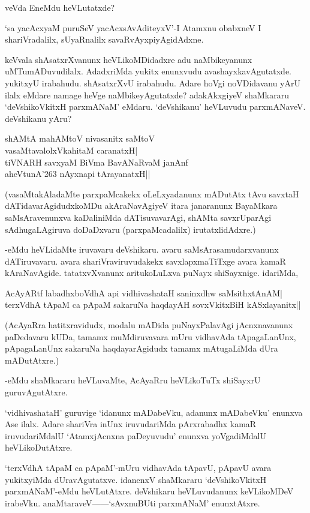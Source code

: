 veVda EneMdu heVLutatxde?

`sa yacAcxyaM puruSeV yacAcxsAvAditeyxV'-I Atamxnu obabxneV I shariVradalilx, sUyaRnalilx savaRvAyxpiyAgidAdxne.

keVvala shAsatxrXvanunx heVLikoMDidadxre adu naMbikeyanunx uMTumADuvudilalx. AdadxriMda yukitx enunxvudu avashayxkavAgutatxde. yukitxyU irabahudu. shAsatxrXvU irabahudu. Adare hoVgi noVDidavanu yArU ilalx eMdare namage heVge naMbikeyAgutatxde? adakAkxgiyeV shaMkararu `deVshikoVkitxH parxmANaM' eMdaru. `deVshikanu' heVLuvudu parxmANaveV. deVshikanu yAru?

\begin{shloka}
shAMtA mahAMtoV nivasanitx saMtoV\\
vasaMtavalolxVkahitaM caranatxH|\\
tiVNARH savxyaM BiVma BavANaRvaM janAnf\\
aheVtunA\char'263 nAyxnapi tArayanatxH||
\end{shloka}

(vasaMtakAladaMte parxpaMcakekx oLeLxyadanunx mADutAtx tAvu savxtaH dATidavarAgidudxkoMDu akAraNavAgiyeV itara janaranunx BayaMkara saMsAravenunxva kaDaliniMda dATisuvavarAgi, shAMta savxrUparAgi sAdhugaLAgiruva doDaDxvaru (parxpaMcadalilx) irutatxlidAdxre.)

-eMdu heVLidaMte iruvavaru deVshikaru. avaru saMsArasamudarxvanunx dATiruvavaru. avara shariVraviruvudakekx savxlapxmaTiTxge avara kamaR kAraNavAgide. tatatxvXvanunx aritukoLuLxva puNayx shiSayxnige. idariMda,

\begin{shloka}
AcAyARtf labadhxboVdhA api vidhivashataH saninxdhw saMsithxtAnAM|\\
terxVdhA tApaM ca pApaM sakaruNa haqdayAH sovxVkitxBiH kASxlayanitx||
\end{shloka}

(AcAyaRra hatitxravidudx, modalu mADida puNayxPalavAgi jAcnxnavanunx paDedavaru kUDa, tamamx muMdiruvavara mUru vidhavAda tApagaLanUnx, pApagaLanUnx sakaruNa haqdayarAgidudx tamamx mAtugaLiMda dUra mADutAtxre.)

-eMdu shaMkararu heVLuvaMte, AcAyaRru heVLikoTuTx shiSayxrU guruvAgutAtxre.

`vidhivashataH' guruvige `idanunx mADabeVku, adanunx mADabeVku' enunxva Ase ilalx. Adare shariVra inUnx iruvudariMda pArxrabadhx kamaR iruvudariMdalU `AtamxjAcnxna paDeyuvudu' enunxva yoVgadiMdalU heVLikoDutAtxre.

`terxVdhA tApaM ca pApaM'-mUru vidhavAda tApavU, pApavU avara yukitxyiMda dUravAgutatxve. idanenxV shaMkararu `deVshikoVkitxH parxmANaM'-eMdu heVLutAtxre. deVshikaru heVLuvudanunx keVLikoMDeV irabeVku. anaMtaraveV------`sAvxnuBUti parxmANaM' enunxtAtxre.

